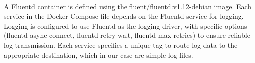 \paragraph{} A Fluentd container is defined using the fluent/fluentd:v1.12-debian image. Each service in the Docker Compose file depends on the Fluentd service for logging. Logging is configured to use Fluentd as the logging driver, with specific options (fluentd-async-connect, fluentd-retry-wait, fluentd-max-retries) to ensure reliable log transmission. Each service specifies a unique tag to route log data to the appropriate destination, which in our case are simple log files.